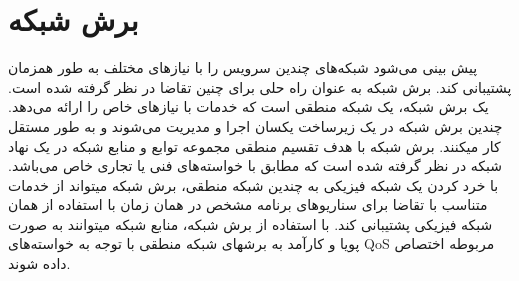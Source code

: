 \section{برش شبکه}
 پیش بینی می‌شود شبکه‌‌های  چندین سرویس را با نیازهای مختلف به طور همزمان پشتیبانی کند.
 برش شبکه
به عنوان راه حلی برای چنین تقاضا در نظر گرفته شده است.
یک برش شبکه، یک شبکه منطقی  است که خدمات  با نیازهای خاص را ارائه می‌دهد.
 چندین برش شبکه
در یک زیرساخت یکسان
  اجرا و مدیریت می‌شوند و
به طور مستقل کار میکنند.
برش شبکه
 با هدف تقسیم منطقی مجموعه توابع و منابع شبکه در یک نهاد شبکه در نظر گرفته شده است که مطابق با خواسته‌‌های فنی یا تجاری خاص می‌باشد.
 با خرد کردن یک شبکه فیزیکی به چندین شبکه منطقی، برش شبکه میتواند از خدمات متناسب با تقاضا برای سناریوهای برنامه مشخص در همان زمان با استفاده از همان شبکه فیزیکی پشتیبانی کند.
با استفاده از برش شبکه، منابع شبکه میتوانند به صورت پویا و کارآمد به برشهای شبکه منطقی با توجه به خواسته‌‌های QoS مربوطه اختصاص داده شوند\cite{NS1}. 

